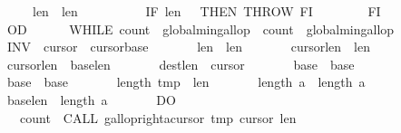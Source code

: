 \begin{isabellebody}
\ \ \ \ \ \ \ \ \ \ {\isasymacute}len{}\ {\isacharcolon}{\isacharequal}{\isacharequal}\ {\isasymacute}len{}{\isacharminus}{}{\isacharsemicolon}{\isacharsemicolon}\isanewline
\ \ \ \ \ \ \ \ \ \ IF\ {\isasymacute}len{}\ {\isacharequal}\ {}\ THEN\ THROW\ FI\isanewline
\ \ \ \ \ \ \ \ FI\isanewline
\ \ \ \ \ \ OD{\isacharsemicolon}{\isacharsemicolon}\isanewline
\ \ \ \ \ \ WHILE\ {\isacharparenleft}{\isasymacute}count{}\ {\isasymge}\ {\isasymacute}global{\isacharunderscore}min{\isacharunderscore}gallop\ {\isacharbar}\ {\isasymacute}count{}\ {\isasymge}\ {\isasymacute}global{\isacharunderscore}min{\isacharunderscore}gallop{\isacharparenright}\isanewline
\ \ \ \ \ \ INV\ {\isasymlbrace}\ {\isasymacute}cursor{}{\isasymge}{}\ {\isasymand}\ {\isasymacute}cursor{}{\isasymge}{\isasymacute}base{}\ {\isasymand}\isanewline
\ \ \ \ \ \ {\isasymacute}len{}{\isachargreater}{}\ {\isasymand}\ {\isasymacute}len{}{\isachargreater}{}\ {\isasymand}\isanewline
\ \ \ \ \ \ {\isasymacute}cursor{}{\isacharplus}{\isasymacute}len{}\ {\isacharequal}\ \isactrlbsup {\isasymsigma}\isactrlesup len{}\ {\isasymand}\isanewline
\ \ \ \ \ \ {\isasymacute}cursor{}{\isacharplus}{\isasymacute}len{}\ {\isacharequal}\ {\isasymacute}base{}{\isacharplus}\isactrlbsup {\isasymsigma}\isactrlesup len{}\ {\isasymand}\isanewline
\ \ \ \ \ \ {\isasymacute}dest{\isacharplus}{\isasymacute}len{}\ {\isacharequal}\ {\isasymacute}cursor{}\ {\isasymand}\isanewline
\ \ \ \ \ \ {\isasymacute}base{}\ {\isacharequal}\ \isactrlbsup {\isasymsigma}\isactrlesup base{}\ {\isasymand}\isanewline
\ \ \ \ \ \ {\isasymacute}base{}\ {\isacharequal}\ \isactrlbsup {\isasymsigma}\isactrlesup base{}\ {\isasymand}\isanewline
\ \ \ \ \ \ length\ {\isasymacute}tmp\ {\isacharequal}\ \isactrlbsup {\isasymsigma}\isactrlesup len{}\ {\isasymand}\isanewline
\ \ \ \ \ \ length\ {\isasymacute}a\ {\isacharequal}\ length\ \isactrlbsup {\isasymsigma}\isactrlesup a\ {\isasymand}\isanewline
\ \ \ \ \ \ {\isacharparenleft}\isactrlbsup {\isasymsigma}\isactrlesup base{}{\isacharplus}\isactrlbsup {\isasymsigma}\isactrlesup len{}\ {\isasymle}\ length\ \isactrlbsup {\isasymsigma}\isactrlesup a{\isacharparenright}\ {\isasymrbrace}\isanewline
\ \ \ \ \ \ DO\isanewline
\ \ \ \ \ \ \ \ {\isasymacute}count{}\ {\isacharcolon}{\isacharequal}{\isacharequal}\ CALL\ gallop{\isacharunderscore}right{\isacharparenleft}{\isasymacute}a{\isacharbang}{\isasymacute}cursor{}{\isacharcomma}\ {\isasymacute}tmp{\isacharcomma}\ {\isasymacute}cursor{}{\isacharcomma}\ {\isasymacute}len{}{\isacharcomma}\ {}{\isacharparenright}{\isacharsemicolon}{\isacharsemicolon}\isanewline

\end{isabellebody}
